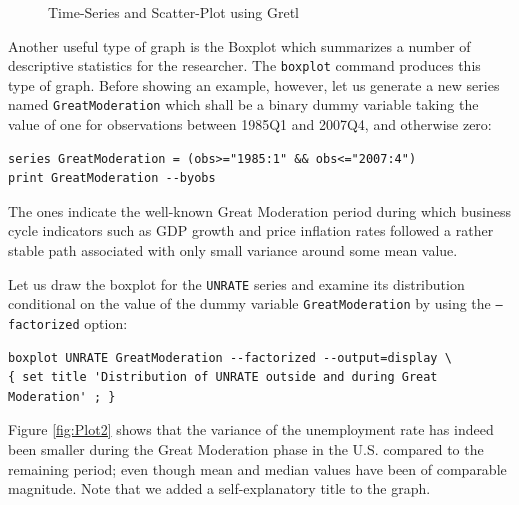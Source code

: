 \documentclass[11pt]{article}
\begin{document}
\begin{figure}[h!]
	\centering

	\caption{Time-Series and Scatter-Plot using Gretl}
	\label{fig:Plot1}
\end{figure}

Another useful type of graph is the Boxplot which summarizes a number of descriptive statistics for the researcher. The \texttt{boxplot} command produces this type of graph. Before showing an example, however, let us generate a new series named \texttt{GreatModeration} which shall be a binary dummy variable taking the value of one for observations between 1985Q1 and 2007Q4, and otherwise zero:
\begin{Verbatim}[baselinestretch=0.75, fontsize=\small]
series GreatModeration = (obs>="1985:1" && obs<="2007:4")
print GreatModeration --byobs
\end{Verbatim}
The ones indicate the well-known Great Moderation period during which business cycle indicators such as GDP growth and price inflation rates followed a rather stable path associated with only small variance around some mean value.

Let us draw the boxplot for the \texttt{UNRATE} series and examine its distribution conditional on the value of the dummy variable \texttt{GreatModeration} by using the \texttt{---factorized} option: 
\begin{Verbatim}[baselinestretch=0.75, fontsize=\small]
boxplot UNRATE GreatModeration --factorized --output=display \
{ set title 'Distribution of UNRATE outside and during Great Moderation' ; }
\end{Verbatim}
Figure \ref{fig:Plot2} shows that the variance of the unemployment rate has indeed been smaller during the Great Moderation phase in the U.S. compared to the remaining period; even though mean and median values have been of comparable magnitude. Note that we added a self-explanatory title to the graph.
\end{document}
